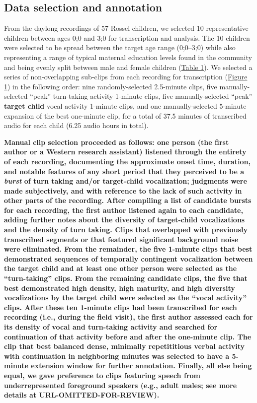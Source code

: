 \documentclass[,man,floatsintext]{apa6}
\begin{document}
\subsection{Data selection and annotation}\label{methods-samples}

From the daylong recordings of 57 Rossel children, we selected 10
representative children between ages 0;0 and 3;0 for transcription and
analysis. The 10 children were selected to be spread between the target
age range (0;0--3;0) while also representing a range of typical maternal
education levels found in the community and being evenly split between
male and female children (\protect\hyperlink{tab1}{Table 1}). We
selected a series of non-overlapping sub-clips from each recording for
transcription (\protect\hyperlink{fig1}{Figure 1}) in the following
order: nine randomly-selected 2.5-minute clips, five manually-selected
\enquote{peak} turn-taking activity 1-minute clips, five
manually-selected \enquote{peak} \textbf{target child} vocal activity
1-minute clips, and one manually-selected 5-minute expansion of the best
one-minute clip, for a total of 37.5 minutes of transcribed audio for
each child (6.25 audio hours in total).

\textbf{Manual clip selection proceeded as follows: one person (the
first author or a Western research assistant) listened through the
entirety of each recording, documenting the approximate onset time,
duration, and notable features of any short period that they perceived
to be a \emph{burst} of turn taking and/or target-child vocalization;
judgments were made subjectively, and with reference to the lack of such
activity in other parts of the recording. After compiling a list of
candidate bursts for each recording, the first author listened again to
each candidate, adding further notes about the diversity of target-child
vocalizations and the density of turn taking. Clips that overlapped with
previously transcribed segments or that featured significant background
noise were eliminated. From the remainder, the five 1-minute clips that
best demonstrated sequences of temporally contingent vocalization
between the target child and at least one other person were selected as
the \enquote{turn-taking} clips. From the remaining candidate clips, the
five that best demonstrated high density, high maturity, and high
diversity vocalizations by the target child were selected as the
\enquote{vocal activity} clips. After these ten 1-minute clips had been
transcribed for each recording (i.e., during the field visit), the first
author assessed each for its density of vocal and turn-taking activity
and searched for continuation of that activity before and after the
one-minute clip. The clip that best balanced dense, minimally
repetititious verbal activity with continuation in neighboring minutes
was selected to have a 5-minute extension window for further annotation.
Finally, all else being equal, we gave preference to clips featuring
speech from underrepresented foreground speakers (e.g., adult males; see
more details at URL-OMITTED-FOR-REVIEW).}
\end{document}

